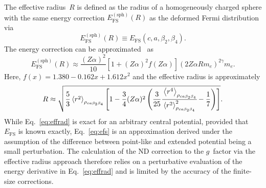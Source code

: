 The effective radius~$R$ is defined as the radius of a homogeneously charged sphere with the same energy correction $E^{(\text{sph})}_{\text{FS}}(R)$ as the deformed Fermi distribution via
\begin{equation}
E^{(\text{sph})}_{\text{FS}}(R) \equiv E_{\text{FS}}(c,a,\beta_2,\beta_4).
\label{eq:effradNum}
\end{equation}
The energy correction can be approximated~\cite{Shabaev1993} as
\begin{equation}
E^{(\text{sph})}_{\text{FS}}(R)\approx\frac{(Z\alpha)^2}{10}\left[{1}{+}(Z\alpha)^2f(Z\alpha) \right](2Z\alpha R m_e)^{2\gamma}m_e.
\label{eq:efs}
\end{equation}
Here, $f(x)=1.380-0.162x+1.612x^2$ and the effective radius is approximately
\begin{equation}
R\approx\sqrt{\frac{5}{3}\left<r^2\right>_{\rho_{ca\beta_2\beta_4}}\left[ 1-\frac{3}{4}(Z\alpha)^2 \left( \frac{3}{25}\cfrac{\left<r^4\right>_{\rho_{ca\beta_2\beta_4}}}{\left<r^2\right>^2_{\rho_{ca\beta_2\beta_4}}}-\frac{1}{7} \right) \right]}.
\label{eq:radius}
\end{equation}
While Eq.~\eqref{eq:effrad} is exact for an arbitrary central potential, provided that $E_{\text{FS}}$ is known exactly, Eq.~\eqref{eq:efs} is an approximation derived under the assumption of the difference between point-like and extended potential being a small perturbation. The calculation of the ND correction to the $g$~factor via the effective radius approach therefore relies on a perturbative evaluation of the energy derivative in Eq.~\eqref{eq:effrad} and is limited by the accuracy of the finite-size corrections.

